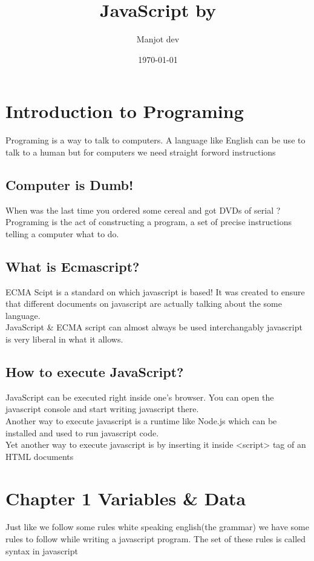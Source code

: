 \documentclass[11pt]{article}
\author{Manjot dev}
\date{\today}
\title{JavaScript by}
\begin{document}
\maketitle
\section*{Introduction to Programing}
\label{sec:orgaf2f964}
Programing is a  way to talk to computers. A language like  English can be use to  talk to a human but for computers  we need straight forword instructions
\subsection*{Computer is Dumb!}
\label{sec:orga299c87}
When was the last time you ordered some cereal and got DVDs of serial ? \\
Programing is the act of constructing a program, a set of precise instructions telling a computer what to do.
\subsection*{What is Ecmascript?}
\label{sec:org9e9b420}
ECMA Scipt is a standard on which javascript is based!
It was created to ensure that different documents on javascript are actually talking about the some language. \\
JavaScript \& ECMA script can almost always be used interchangably javascript  is very liberal  in what it allows.
\subsection*{How to execute JavaScript?}
\label{sec:org769762b}
JavaScript can be executed right inside one's browser. You can open the javascript console and start writing javascript there. \\
Another way to execute javascript is a runtime like Node.js which can be installed and used to run javascript code. \\
Yet another way to execute javascript is by inserting it inside <script> tag of an HTML documents

\newpage
\section*{Chapter 1 Variables \& Data}
\label{sec:orgd0fb8f4}
Just like we follow some rules white speaking english(the grammar) we have some rules to follow while writing a javascript program. The set of these rules is called syntax in javascript
\end{document}
